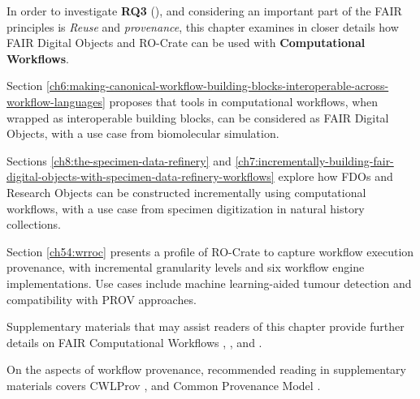 In order to investigate \textbf{RQ3} (), and considering an important part of the FAIR principles is \emph{Reuse} and \emph{provenance}, this chapter examines in closer details how FAIR Digital Objects and RO-Crate can be used with \textbf{Computational Workflows}. 

Section \vref{ch6:making-canonical-workflow-building-blocks-interoperable-across-workflow-languages} proposes that tools in computational workflows, when wrapped as interoperable building blocks, can be considered as FAIR Digital Objects, with a use case from biomolecular simulation.

Sections \vref{ch8:the-specimen-data-refinery} and \vref{ch7:incrementally-building-fair-digital-objects-with-specimen-data-refinery-workflows} explore how FDOs and Research Objects can be constructed incrementally using computational workflows, with a use case from specimen digitization in natural history collections.

Section \vref{ch54:wrroc} presents a profile of RO-Crate to capture workflow execution provenance, with incremental granularity levels and six workflow engine implementations. Use cases include machine learning-aided tumour detection and compatibility with PROV approaches. 

Supplementary materials that may assist readers of this chapter provide further details on FAIR Computational Workflows \cite{Goble 2020},  \cite{Goble 2021},  \cite{Crusoe 2022} and  \cite{ch6-37}. 

On the aspects of workflow provenance, recommended reading in supplementary materials covers CWLProv \cite{Khan 2019},  \cite{De Geest 2022} and Common Provenance Model \cite{Wittner 2020,Wittner 2023}.
